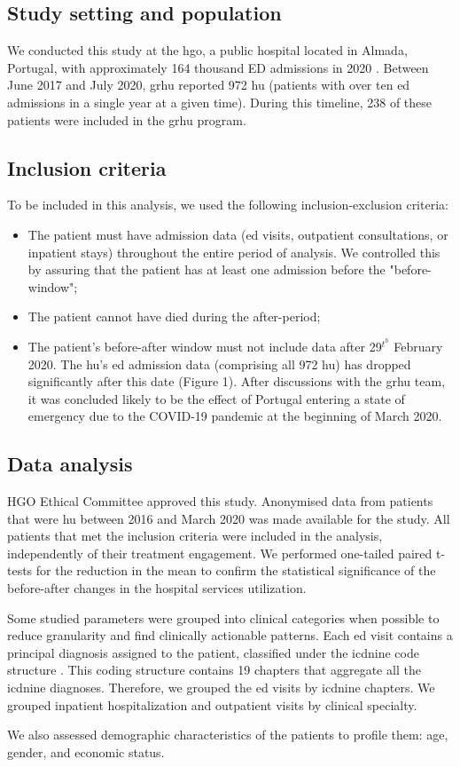 \documentclass{bmcart}
\begin{document}
\subsection*{Study setting and population}
We conducted this study at the \gls{hgo}, a public hospital located in Almada, Portugal, with approximately 164 thousand ED admissions in 2020 \cite{hospital_garcia_de_orta_relatorio_2020}. 
Between June 2017 and July 2020, \gls{grhu} reported 972 \gls{hu} (patients with over ten \gls{ed} admissions in a single year at a given time). 
During this timeline, 238 of these patients were included in the \gls{grhu} program.

\subsection*{Inclusion criteria}
\label{sec:inclusion}
To be included in this analysis, we used the following inclusion-exclusion criteria:
\begin{itemize}
    \item The patient must have admission data (\gls{ed} visits, outpatient consultations, or inpatient stays) throughout the entire period of analysis. We controlled this by assuring that the patient has at least one admission before the "before-window";
    \item The patient cannot have died during the after-period;
    \item The patient's before-after window must not include data after 29$^t^h$ February 2020. The \gls{hu}'s \gls{ed} admission data (comprising all 972  \gls{hu}) has dropped significantly after this date (Figure 1). After discussions with the \gls{grhu} team, it was concluded likely to be the effect of Portugal entering a state of emergency due to the COVID-19 pandemic at the beginning of March 2020.
\end{itemize}

\subsection*{Data analysis}
HGO Ethical Committee approved this study. 
Anonymised data from patients that were \gls{hu} between 2016 and March 2020 was made available for the study.
All patients that met the inclusion criteria were included in the analysis, independently of their treatment engagement. 
We performed one-tailed paired t-tests for the reduction in the mean to confirm the statistical significance of the before-after changes in the hospital services utilization.
\par Some studied parameters were grouped into clinical categories when possible to reduce granularity and find clinically actionable patterns. 
Each \gls{ed} visit contains a principal diagnosis assigned to the patient, classified under the \gls{icdnine} code structure \cite{noauthor_icd-9-cm_2011}. 
This coding structure contains 19 chapters that aggregate all the \gls{icdnine} diagnoses. 
Therefore, we grouped the \gls{ed} visits by \gls{icdnine} chapters. We grouped inpatient hospitalization and outpatient visits by clinical specialty.
\par We also assessed demographic characteristics of the patients to profile them: age, gender, and economic status.
\end{document}
